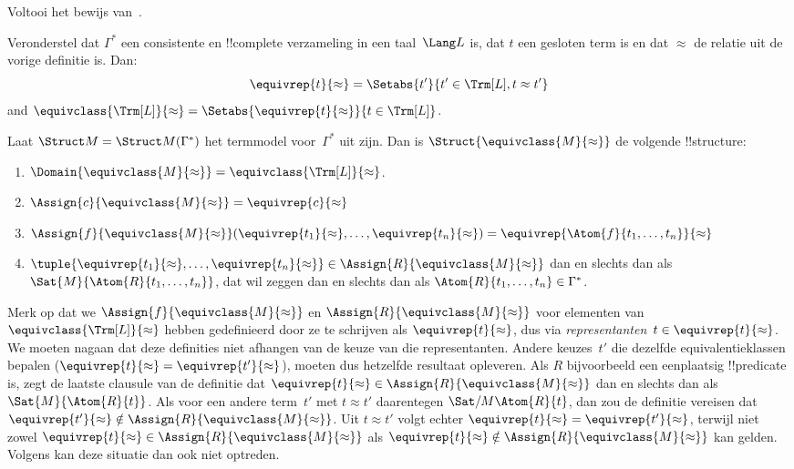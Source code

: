 \documentclass[openany]{memoir}
\begin{document}
\begin{prob}
Voltooi het bewijs van~.
\end{prob}

\begin{defn}
Veronderstel dat $\Gamma^*$ een consistente en !!{complete} verzameling
in een taal~$\Lang L$ is, dat $t$ een gesloten term is en dat $\approx$
de relatie uit de vorige definitie is. Dan:
\[
\equivrep{t}{\approx} = \Setabs{t'}{t'\in \Trm[L], t \approx t'}
\]
and $\equivclass{\Trm[L]}{\approx} = \Setabs{\equivrep{t}{\approx}}{t \in \Trm[L]}$.
\end{defn}

\begin{defn}
Laat $\Struct M = \Struct M(\Gamma^*)$ het termmodel voor~$\Gamma^*$ uit
 zijn. Dan is
$\Struct{\equivclass{M}{\approx}}$ de volgende !!{structure}:
\begin{enumerate}
\item $\Domain{\equivclass{M}{\approx}} = \equivclass{\Trm[L]}{\approx}$.
\item $\Assign{c}{\equivclass{M}{\approx}} = \equivrep{c}{\approx}$
\item $\Assign{f}{\equivclass{M}{\approx}}(\equivrep{t_1}{\approx}, \dots,
  \equivrep{t_n}{\approx}) = \equivrep{\Atom{f}{t_1,\dots, t_n}}{\approx}$
\item $\tuple{\equivrep{t_1}{\approx}, \dots, \equivrep{t_n}{\approx}} \in
  \Assign{R}{\equivclass{M}{\approx}}$ dan en slechts dan als
  $\Sat{M}{\Atom{R}{t_1,\dots, t_n}}$, dat wil zeggen dan en slechts dan
  als $\Atom{R}{t_1,\dots,
  t_n} \in \Gamma^*$.
\end{enumerate}
\end{defn}

\begin{explain}
Merk op dat we $\Assign{f}{\equivclass{M}{\approx}}$ en
$\Assign{R}{\equivclass{M}{\approx}}$ voor elementen van
$\equivclass{\Trm[L]}{\approx}$ hebben gedefinieerd door ze te schrijven
als $\equivrep{t}{\approx}$, dus via \emph{representanten}~$t \in
\equivrep{t}{\approx}$. We moeten nagaan dat deze definities niet afhangen
van de keuze van die representanten. Andere keuzes~$t'$ die dezelfde
equivalentieklassen bepalen
($\equivrep{t}{\approx} = \equivrep{t'}{\approx}$), moeten dus hetzelfde
resultaat opleveren. Als $R$ bijvoorbeeld een eenplaatsig !!{predicate}
is, zegt de laatste clausule van de definitie dat
$\equivrep{t}{\approx} \in \Assign{R}{\equivclass{M}{\approx}}$ dan en
slechts dan als $\Sat{M}{\Atom{R}{t}}$. Als voor een andere term~$t'$ met
$t \approx t'$ daarentegen $\Sat/{M}{\Atom{R}{t}}$, dan zou de definitie
vereisen dat $\equivrep{t'}{\approx} \notin
\Assign{R}{\equivclass{M}{\approx}}$. Uit $t \approx t'$ volgt echter
$\equivrep{t}{\approx} = \equivrep{t'}{\approx}$, terwijl niet zowel
$\equivrep{t}{\approx} \in \Assign{R}{\equivclass{M}{\approx}}$ als
$\equivrep{t}{\approx} \notin \Assign{R}{\equivclass{M}{\approx}}$ kan
gelden. Volgens  kan deze situatie dan ook niet
optreden.
\end{explain}
\end{document}
